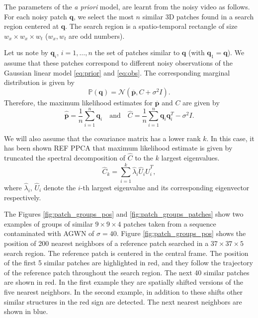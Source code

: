 \documentclass[10pt, journal, twocolumn, final, a4paper]{IEEEtran}
\newcommand{\ma}[1]{\boldsymbol{#1}}
\begin{document}
The parameters of the \textit{a priori} model, are learnt from the noisy video as
follows. For each noisy patch $\ma q$, we select the most $n$
similar 3D patches found in a search region centered at $\ma q$. The
search region is a spatio-temporal rectangle of size $w_x \times
w_x \times w_t$ ($w_x, w_t$ are odd numbers). 

Let us note by $\ma q_i$, $i = 1, \dots, n$ the set of patches
similar to $\ma q$ (with $\ma q_1 = \ma q$). We assume that these 
patches correspond to different noisy observations of the Gaussian linear model
\eqref{eq:prior} and \eqref{eq:obs}. The corresponding marginal distribution is given by
\[\mathds P(\ma q) = \mathcal N(\overline{\ma p}, C + \sigma^2I). \]
Therefore, the maximum likelihood estimates for $\overline{\ma p}$ and $C$ are given by 
\begin{equation}
	\widehat{\overline{\ma p}} = \frac1{n}\sum_{i = 1}^{n}\ma q_i \quad\text{and}\quad 
		\widehat C= \frac1n\sum_{i = 1}^{n}\ma q_i\ma q_i^T - \sigma^2I.
	\label{eq:learn_parameters}
\end{equation}

We will also assume that the covariance matrix has a lower rank $k$.  In this
case, it has been shown REF PPCA that maximum likelihood estimate is given by
truncated the spectral decomposition of $\widehat C$ to the $k$ largest
eigenvalues.
\begin{equation}
\widehat C_k = \sum_{i = 1}^k\widehat \lambda_i\widehat U_i\widehat U_i^T,
\end{equation}
where $\widehat \lambda_i$, $\widehat U_i$ denote the $i$-th largest
eigenvalue and its corresponding eigenvector respectively.

The Figures \ref{fig:patch_groups_pos} and \ref{fig:patch_groups_patches}
show two examples of groups of similar $9\times 9\times 4$ patches taken from
a sequence contaminated with AGWN of $\sigma = 40$. Figure
\ref{fig:patch_groups_pos} shows the position of 200 nearest neighbors of a
reference patch searched in a $37\times 37\times 5$ search region. The
reference patch is centered in the central frame. The position of the first 5
similar patches are highlighted in red, and they follow the trajectory of the
reference patch throughout the search region.  The next 40 similar patches are
shown in red. In the first example they are spatially shifted versions of the
five nearest neighbors. In the second example, in addition to these shifts
other similar structures in the red sign are detected.  The next nearest
neighbors are shown in blue.
\end{document}
